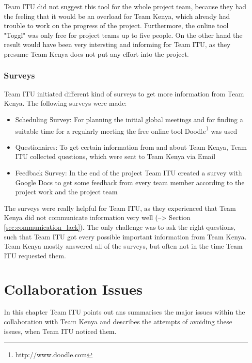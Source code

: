 Team ITU did not suggest this tool for the whole project team, because they had the feeling that it would be an overload for Team Kenya, which already had trouble to work on the progress of the project. Furthermore, the online tool "Toggl" was only free for project teams up to five people. On the other hand the result would have been very intersting and informing for Team ITU, as they presume Team Kenya does not put any effort into the project.


\subsubsection {Surveys}
\label{sec:surveys}
Team ITU initiated different kind of surveys to get more information from Team Kenya. The following surveys were made:
	\begin{itemize}
		\item Scheduling Survey: For planning the initial global meetings and for finding a suitable time for a regularly meeting the free online tool Doodle\footnote{http://www.doodle.com} was used
		\item Questionaires: To get certain information from and about Team Kenya, Team ITU collected questions, which were sent to Team Kenya via Email 
		\item Feedback Survey: In the end of the project Team ITU created a survey with Google Docs to get some feedback from every team member according to the project work and the project team
	\end{itemize}
The surveys were really helpful for Team ITU, as they experienced that Team Kenya did not communicate information very well (--> Section \ref{sec:communication_lack}). The only challenge was to ask the right questions, such that Team ITU got every possible important information from Team Kenya. Team Kenya mostly answered all of the surveys, but often not in the time Team ITU requested them.



\section{Collaboration Issues}
\label{sec:issues}
In this chapter Team ITU points out ans summarises the major issues within the collaboration with Team Kenya and describes the attempts of avoiding these issues, when Team ITU noticed them.

